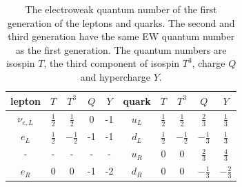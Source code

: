 \begin{table}[ht]
    \centering
    \setlength{\tabcolsep}{1 em}
    \renewcommand{\arraystretch}{1.5}
    \caption{The electroweak quantum number of the first generation of the leptons and quarks. The second and third generation have the same EW quantum number as the first generation. The quantum numbers are isospin $T$, the third component of isospin $T^3$, charge $Q$ and hypercharge $Y$. }
    \begin{tabular}{ccccc|ccccc}
    \hline
    lepton      & $T$           & $T^3$          & $Q$ & $Y$ & quark  & $T$           & $T^3$          & $Q$            & $Y$            \\
    \hline
    $\nu_{e,L}$ & $\frac{1}{2}$ & $\frac{1}{2}$  & 0   & -1  & $u_L$  & $\frac{1}{2}$ & $\frac{1}{2}$  & $\frac{2}{3}$  & $\frac{1}{3}$  \\
    $e_L$       & $\frac{1}{2}$ & $-\frac{1}{2}$ & -1  & -1  & $d_L$  & $\frac{1}{2}$ & $-\frac{1}{2}$ & $-\frac{1}{3}$ & $\frac{1}{3}$  \\
    \hline
    -           & -             & -              & -   & -   & $u_R$  & 0             & 0              & $\frac{2}{3}$  & $\frac{4}{3}$  \\
    $e_R$       & 0             & 0              & -1  & -2  & $d_R$  & 0             & 0              & $-\frac{1}{3}$ & $-\frac{2}{3}$ \\
    \hline
    \end{tabular}
    \label{tab:relatedWorks:smParticles:ewQuantumNumber}
\end{table}


